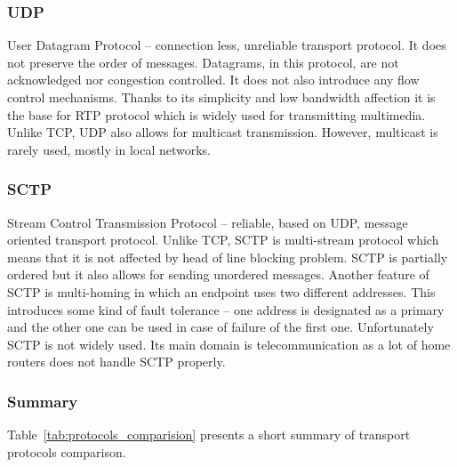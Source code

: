 \subsubsection{UDP}
User Datagram Protocol -- connection less, unreliable transport protocol.
It does not preserve the order of messages.
Datagrams, in this protocol, are not acknowledged nor congestion controlled.
It does not also introduce any flow control mechanisms.
Thanks to its simplicity and low bandwidth affection it is the base for RTP protocol which is widely used for transmitting multimedia.
Unlike TCP, UDP also allows for multicast transmission.
However, multicast is rarely used, mostly in local networks.

\subsubsection{SCTP}
Stream Control Transmission Protocol -- reliable, based on UDP, message oriented transport protocol.
Unlike TCP, SCTP is multi-stream protocol which means that it is not affected by head of line blocking problem.
SCTP is partially ordered but it also allows for sending unordered messages.
Another feature of SCTP is multi-homing in which an endpoint uses two different addresses.
This introduces some kind of fault tolerance -- one address is designated as a primary and the other one can be used in case of failure of the first one.
Unfortunately SCTP is not widely used.
Its main domain is telecommunication as a lot of home routers does not handle SCTP properly.

\subsubsection{Summary}
Table~\ref{tab:protocols_comparision} presents a short summary of transport protocols comparison.
\begin{table}[h]
    \centering
    \caption{\label{tab:protocols_comparision}Transport protocols comparison.}
\end{table}
